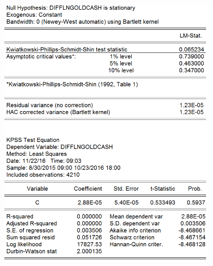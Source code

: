 \documentclass[11pt]{report}
\begin{document}
\begin{figure}[!h]
\begin{minipage}[c]{.46\linewidth}
\includegraphics[scale=0.5]{Appendix/chap2/13}
\end{minipage} \hfill
\end{figure}
\end{document}

